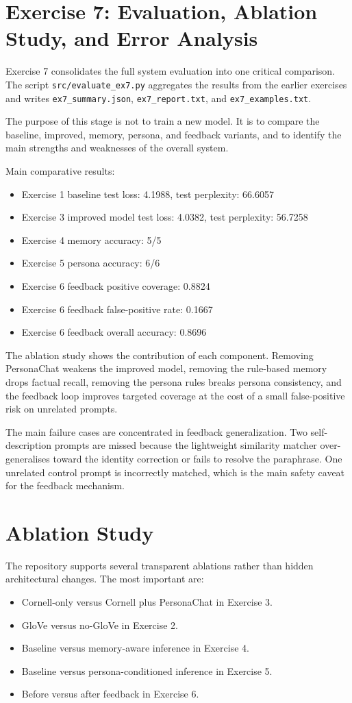 \documentclass[11pt,a4paper]{article}
\begin{document}
\section{Exercise 7: Evaluation, Ablation Study, and Error Analysis}
Exercise 7 consolidates the full system evaluation into one critical comparison. The script \texttt{src/evaluate\_ex7.py} aggregates the results from the earlier exercises and writes \texttt{ex7\_summary.json}, \texttt{ex7\_report.txt}, and \texttt{ex7\_examples.txt}.

The purpose of this stage is not to train a new model. It is to compare the baseline, improved, memory, persona, and feedback variants, and to identify the main strengths and weaknesses of the overall system.

Main comparative results:
\begin{itemize}[leftmargin=*]
	\item Exercise 1 baseline test loss: 4.1988, test perplexity: 66.6057
	\item Exercise 3 improved model test loss: 4.0382, test perplexity: 56.7258
	\item Exercise 4 memory accuracy: 5/5
	\item Exercise 5 persona accuracy: 6/6
	\item Exercise 6 feedback positive coverage: 0.8824
	\item Exercise 6 feedback false-positive rate: 0.1667
	\item Exercise 6 feedback overall accuracy: 0.8696
\end{itemize}

The ablation study shows the contribution of each component. Removing PersonaChat weakens the improved model, removing the rule-based memory drops factual recall, removing the persona rules breaks persona consistency, and the feedback loop improves targeted coverage at the cost of a small false-positive risk on unrelated prompts.

The main failure cases are concentrated in feedback generalization. Two self-description prompts are missed because the lightweight similarity matcher over-generalises toward the identity correction or fails to resolve the paraphrase. One unrelated control prompt is incorrectly matched, which is the main safety caveat for the feedback mechanism.

\section{Ablation Study}
The repository supports several transparent ablations rather than hidden architectural changes. The most important are:
\begin{itemize}[leftmargin=*]
	\item Cornell-only versus Cornell plus PersonaChat in Exercise 3.
	\item GloVe versus no-GloVe in Exercise 2.
	\item Baseline versus memory-aware inference in Exercise 4.
	\item Baseline versus persona-conditioned inference in Exercise 5.
	\item Before versus after feedback in Exercise 6.
\end{itemize}
\end{document}
